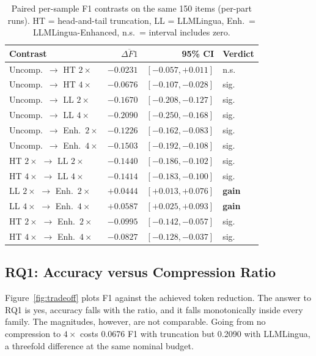 \documentclass[10pt,a4paper,twocolumn]{article}
\begin{document}
\begin{table}[t]
\centering
\footnotesize
\setlength{\tabcolsep}{3pt}
\begin{tabular}{@{}lrrl@{}}
\toprule
Contrast & $\overline{\Delta F1}$ & 95\% CI & Verdict \\
\midrule
Uncomp.\ $\rightarrow$ HT $2\times$ & $-0.0231$ & $[-0.057,+0.011]$ & n.s. \\
Uncomp.\ $\rightarrow$ HT $4\times$ & $-0.0676$ & $[-0.107,-0.028]$ & sig. \\
Uncomp.\ $\rightarrow$ LL $2\times$ & $-0.1670$ & $[-0.208,-0.127]$ & sig. \\
Uncomp.\ $\rightarrow$ LL $4\times$ & $-0.2090$ & $[-0.250,-0.168]$ & sig. \\
Uncomp.\ $\rightarrow$ Enh.\ $2\times$ & $-0.1226$ & $[-0.162,-0.083]$ & sig. \\
Uncomp.\ $\rightarrow$ Enh.\ $4\times$ & $-0.1503$ & $[-0.192,-0.108]$ & sig. \\
HT $2\times$ $\rightarrow$ LL $2\times$ & $-0.1440$ & $[-0.186,-0.102]$ & sig. \\
HT $4\times$ $\rightarrow$ LL $4\times$ & $-0.1414$ & $[-0.183,-0.100]$ & sig. \\
LL $2\times$ $\rightarrow$ Enh.\ $2\times$ & $+0.0444$ & $[+0.013,+0.076]$ & \textbf{gain} \\
LL $4\times$ $\rightarrow$ Enh.\ $4\times$ & $+0.0587$ & $[+0.025,+0.093]$ & \textbf{gain} \\
HT $2\times$ $\rightarrow$ Enh.\ $2\times$ & $-0.0995$ & $[-0.142,-0.057]$ & sig. \\
HT $4\times$ $\rightarrow$ Enh.\ $4\times$ & $-0.0827$ & $[-0.128,-0.037]$ & sig. \\
\bottomrule
\end{tabular}
\caption{Paired per-sample F1 contrasts on the same 150 items (per-part runs).
HT = head-and-tail truncation, LL = LLMLingua, Enh.\ = LLMLingua-Enhanced,
n.s.\ = interval includes zero.}
\label{tab:paired}
\end{table}

\subsection{RQ1: Accuracy versus Compression Ratio}

Figure~\ref{fig:tradeoff} plots F1 against the achieved token reduction. The
answer to RQ1 is yes, accuracy falls with the ratio, and it falls monotonically
inside every family. The magnitudes, however, are not comparable. Going from no
compression to $4\times$ costs 0.0676 F1 with truncation but 0.2090 with
LLMLingua, a threefold difference at the same nominal budget.
\end{document}
